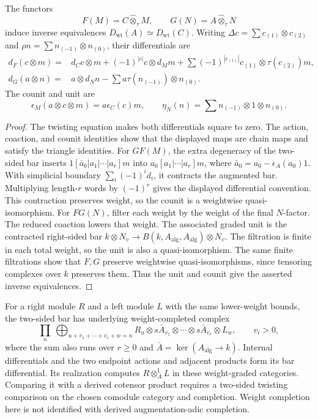 \begin{proposition}
The functors
\[
 F(M)=C\widehat\otimes_\tau M,\qquad
 G(N)=A\widehat\otimes_\tau N
\]
induce inverse equivalences $D_{\mathrm{wt}}(A)\simeq D_{\mathrm{wt}}(C)$.
Writing $\Delta c=\sum c_{(1)}\otimes c_{(2)}$
and $\rho n=\sum n_{(-1)}\otimes n_{(0)}$, their differentials are
\[
\begin{aligned}
 d_F(c\otimes m)={}&d_Cc\otimes m+(-1)^{|c|}c\otimes d_Mm
 +\sum(-1)^{|c_{(1)}|}c_{(1)}\otimes\tau(c_{(2)})m,\\
 d_G(a\otimes n)={}&a\otimes d_Nn
 -\sum a\tau(n_{(-1)})\otimes n_{(0)}.
\end{aligned}
\]
The counit and unit are
\[
 \epsilon_M(a\otimes c\otimes m)=a\epsilon_C(c)m,\qquad
 \eta_N(n)=\sum n_{(-1)}\otimes1\otimes n_{(0)}.
\]
\end{proposition}
\begin{proof}
The twisting equation makes both differentials square to zero.
The action, coaction, and counit identities show that the displayed maps
are chain maps and satisfy the triangle identities.
For $GF(M)$, the extra degeneracy of the two-sided bar inserts
$1[\bar a_0|a_1|\cdots|a_r]m$ into $a_0[a_1|\cdots|a_r]m$,
where $\bar a_0=a_0-\epsilon_A(a_0)1$.
With simplicial boundary $\sum_i(-1)^id_i$, it contracts the augmented bar.
Multiplying length-$r$ words by $(-1)^r$ gives the displayed differential convention.
This contraction preserves weight, so the counit is a weightwise quasi-isomorphism.
For $FG(N)$, filter each weight by the weight of the final $N$-factor.
The reduced coaction lowers that weight.
The associated graded unit is the contracted right-sided bar
$k\otimes N_v\to B(k,A_{\mathrm{alg}},A_{\mathrm{alg}})\otimes N_v$.
The filtration is finite in each total weight, so the unit is also a quasi-isomorphism.
The same finite filtrations show that $F,G$ preserve weightwise quasi-isomorphisms,
since tensoring complexes over $k$ preserves them.
Thus the unit and counit give the asserted inverse equivalences.
\end{proof}

For a right module $R$ and a left module $L$ with the same lower-weight
bounds, the two-sided bar has underlying weight-completed complex
\[
 \prod_n\ \bigoplus_{u+v_1+\cdots+v_r+w=n}
 R_u\otimes s\bar A_{v_1}\otimes\cdots\otimes s\bar A_{v_r}\otimes L_w,
 \qquad v_i>0,
\]
where the sum also runs over $r\ge0$ and $\bar A=\ker(A_{\mathrm{alg}}\to k)$.
Internal differentials and the two endpoint actions and adjacent products
form its bar differential. Its realization computes $R\otimes_A^{\mathbb L}L$
in these weight-graded categories.
Comparing it with a derived cotensor product requires a two-sided twisting
comparison on the chosen comodule category and completion.
Weight completion here is not identified with derived augmentation-adic completion.

